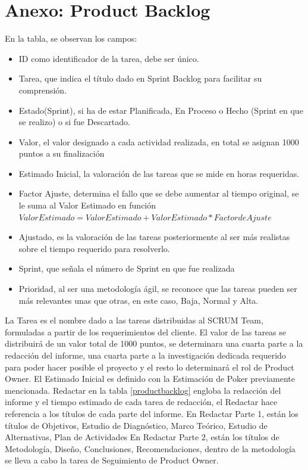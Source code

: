 \section{Anexo: Product Backlog} 
En la tabla, se observan los campos:
\begin{itemize}
	\item ID como identificador de la tarea, debe ser único.
	\item Tarea, que indica el título dado en Sprint Backlog para facilitar su comprensión.
	\item Estado(Sprint), si ha de estar Planificada, En Proceso o Hecho (Sprint en que se realizo) o si fue Descartado.
	\item Valor, el valor designado a cada actividad realizada, en total se asignan 1000 puntos a su finalización
	\item Estimado Inicial, la valoración de las tareas que se mide en horas requeridas.
	\item Factor Ajuste, determina el fallo que se debe aumentar al tiempo original, se le suma al Valor Estimado en función $Valor Estimado = Valor Estimado + Valor Estimado * Factor de Ajuste$
	\item Ajustado, es la valoración de las tareas posteriormente al ser más realistas sobre el tiempo requerido para resolverlo.
	\item Sprint, que señala el número de Sprint en que fue realizada
	\item Prioridad, al ser una metodología ágil, se reconoce que las tareas pueden ser más relevantes unas que otras, en este caso, Baja, Normal y Alta.
	
\end{itemize}
La Tarea es el nombre dado a las tareas distribuidas al SCRUM Team, formuladas a partir de los requerimientos del cliente.
El valor de las tareas se distribuirá de un valor total de 1000 puntos, se determinara una cuarta parte a la redacción del informe, una cuarta parte a la investigación dedicada requerido para poder hacer posible el proyecto y el resto lo determinará el rol de Product Owner.
El Estimado Inicial es definido con la Estimación de Poker previamente mencionada.
Redactar en la tabla \ref{productbacklog} engloba la redacción del informe y el tiempo estimado de cada tarea de redacción, el Redactar hace referencia a los títulos de cada parte del informe.
En Redactar Parte 1, están los títulos de Objetivos, Estudio de Diagnóstico, Marco Teórico, Estudio de Alternativas, Plan de Actividades
En Redactar Parte 2, están los títulos de Metodología, Diseño, Conclusiones, Recomendaciones, dentro de la metodología se lleva a cabo la tarea de Seguimiento de Product Owner.
